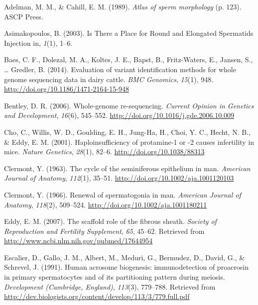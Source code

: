 \documentclass[12pt,twoside]{reedthesis}
\theoremstyle{definition}
\theoremstyle{definition}
\theoremstyle{remark}
\begin{document}
  \noindent
  
  \setlength{\parindent}{-0.20in} \setlength{\leftskip}{0.20in}
  \setlength{\parskip}{8pt}
  
  \hypertarget{refs}{}
  \hypertarget{ref-Adelman1989}{}
  Adelman, M. M., \& Cahill, E. M. (1989). \emph{Atlas of sperm
  morphology} (p. 123). ASCP Press.
  
  \hypertarget{ref-Asimakopoulos2003}{}
  Asimakopoulos, B. (2003). Is There a Place for Round and Elongated
  Spermatids Injection in, \emph{1}(1), 1--6.
  
  \hypertarget{ref-Baes2014}{}
  Baes, C. F., Dolezal, M. A., Koltes, J. E., Bapst, B., Fritz-Waters, E.,
  Jansen, S., \ldots{} Gredler, B. (2014). Evaluation of variant
  identification methods for whole genome sequencing data in dairy cattle.
  \emph{BMC Genomics}, \emph{15}(1), 948.
  \url{http://doi.org/10.1186/1471-2164-15-948}
  
  \hypertarget{ref-Bentley2006}{}
  Bentley, D. R. (2006). Whole-genome re-sequencing. \emph{Current Opinion
  in Genetics and Development}, \emph{16}(6), 545--552.
  \url{http://doi.org/10.1016/j.gde.2006.10.009}
  
  \hypertarget{ref-Cho2001}{}
  Cho, C., Willis, W. D., Goulding, E. H., Jung-Ha, H., Choi, Y. C.,
  Hecht, N. B., \& Eddy, E. M. (2001). Haploinsufficiency of protamine-1
  or -2 causes infertility in mice. \emph{Nature Genetics}, \emph{28}(1),
  82--6. \url{http://doi.org/10.1038/88313}
  
  \hypertarget{ref-Clermont1963}{}
  Clermont, Y. (1963). The cycle of the seminiferous epithelium in man.
  \emph{American Journal of Anatomy}, \emph{112}(1), 35--51.
  \url{http://doi.org/10.1002/aja.1001120103}
  
  \hypertarget{ref-Clermont1966}{}
  Clermont, Y. (1966). Renewal of spermatogonia in man. \emph{American
  Journal of Anatomy}, \emph{118}(2), 509--524.
  \url{http://doi.org/10.1002/aja.1001180211}
  
  \hypertarget{ref-Eddy2007}{}
  Eddy, E. M. (2007). The scaffold role of the fibrous sheath.
  \emph{Society of Reproduction and Fertility Supplement}, \emph{65},
  45--62. Retrieved from \url{http://www.ncbi.nlm.nih.gov/pubmed/17644954}
  
  \hypertarget{ref-Escalier1991}{}
  Escalier, D., Gallo, J. M., Albert, M., Meduri, G., Bermudez, D., David,
  G., \& Schrevel, J. (1991). Human acrosome biogenesis: immunodetection
  of proacrosin in primary spermatocytes and of its partitioning pattern
  during meiosis. \emph{Development (Cambridge, England)}, \emph{113}(3),
  779--788. Retrieved from
  \url{http://dev.biologists.org/content/develop/113/3/779.full.pdf}
  
\end{document}
